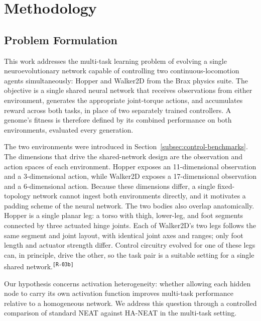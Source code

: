 \documentclass[12pt]{article}
\newcommand{\revID}[1]{\textsuperscript{\scriptsize\texttt{[#1]}}}
\newcommand{\revRepeat}[2]{\textcolor{revTeal}{#2}\revID{#1}}
\begin{document}
\section{Methodology}
\label{sec:methodology}

\subsection{Problem Formulation}
\label{subsec:problem-formulation}

This work addresses the multi-task learning problem of evolving a single neuroevolutionary network capable of controlling two continuous-locomotion agents simultaneously: Hopper and Walker2D from the Brax physics suite.
The objective is a single shared neural network that receives observations from either environment, generates the appropriate joint-torque actions, and accumulates reward across both tasks, in place of two separately trained controllers.
A genome's fitness is therefore defined by its combined performance on both environments, evaluated every generation.

The two environments were introduced in Section~\ref{subsec:control-benchmarks}. The dimensions that drive the shared-network design are the observation and action spaces of each environment.
Hopper exposes an 11-dimensional observation and a 3-dimensional action, while Walker2D exposes a 17-dimensional observation and a 6-dimensional action.
Because these dimensions differ, a single fixed-topology network cannot ingest both environments directly, and it motivates a padding scheme of the neural network.
The two bodies also overlap anatomically.
Hopper is a single planar leg: a torso with thigh, lower-leg, and foot segments connected by three actuated hinge joints.
Each of Walker2D's two legs follows the same segment and joint layout, with identical joint axes and ranges; only foot length and actuator strength differ.
\revRepeat{R-03b}{Control circuitry evolved for one of these legs can, in principle, drive the other, so the task pair is a suitable setting for a single shared network.}

Our hypothesis concerns activation heterogeneity: whether allowing each hidden node to carry its own activation function improves multi-task performance relative to a homogeneous network. We address this question through a controlled comparison of standard NEAT against HA-NEAT in the multi-task setting.
\end{document}
